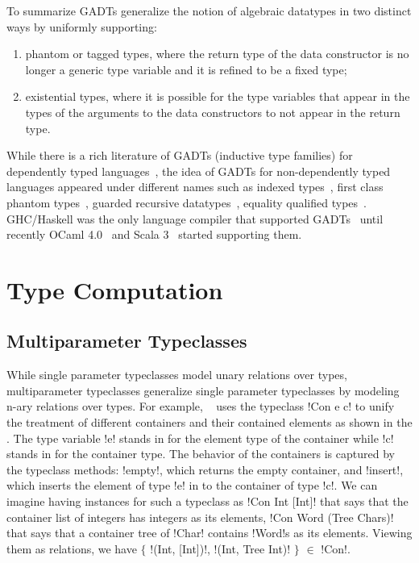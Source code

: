 \documentclass[screen,nonacm,manuscript,review]{acmart} %
\begin{document}
To summarize GADTs generalize the notion of algebraic datatypes in two
distinct ways by uniformly supporting:
\begin{enumerate}
\item phantom or tagged types, where the return type of the data
  constructor is no longer a generic type variable and it is refined
  to be a fixed type;
\item existential types, where it is possible for the type variables
  that appear in the types of the arguments to the data
  constructors to not appear in the return type.
\end{enumerate}

While there is a rich literature of GADTs (inductive type families)
for dependently typed languages~\cite{dybjer_inductive_1991,
  dybjer_inductive_1994}, the idea of GADTs for non-dependently typed
languages appeared under different names such as indexed
types~\cite{zenger_indexed_1997}, first class phantom
types~\cite{cheney_first-class_2003}, guarded recursive
datatypes~\cite{xi_guarded_2003}, equality qualified
types~\cite{sheard_meta-programming_2008}. GHC/Haskell was the only
language compiler that supported GADTs~\cite{peyton_jones_wobbly_2004}
until recently OCaml 4.0~\cite{garrigue_gadt_2011} and
Scala 3~\cite{xu_implementing_2021} started supporting them.

\section{Type Computation}\label{sec:type-computation}
\subsection{Multiparameter Typeclasses}\label{sec:multiparam-typeclasses}
While single parameter typeclasses model unary
relations over types, multiparameter typeclasses generalize single
parameter typeclasses by modeling n-ary relations
over types. For example, ~\citet{jones_tcfd_2000} uses the
typeclass !Con e c! to unify the treatment of
different containers and their contained elements as shown in
the . The type variable !e! stands in for the
element type of the container while !c! stands in for the container
type. The behavior of the containers is captured by the typeclass methods:
!empty!, which returns the empty container, and !insert!,
which inserts the element of type !e! in to the container of type !c!.
We can imagine having instances for such a typeclass as
!Con Int [Int]! that says that the container list of integers has
integers as its elements, !Con Word (Tree Chars)! that says that a
container tree of !Char! contains !Word!s as its
elements. Viewing them as relations,
we have $\{$ !(Int, [Int])!, !(Int, Tree Int)! $\}$ $\in$ !Con!.
\end{document}
